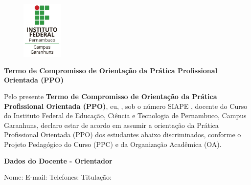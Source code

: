 \documentclass[12pt, a4paper]{article}
\begin{document}
\begin{figure}
  \centering
  \includegraphics[width=2cm]{logo-ifpe-garanhuns}
\end{figure}

\vspace{1cm}

\begin{center}
  \LARGE
  \textbf{
    Termo de Compromisso de Orientação da Prática Profissional Orientada (PPO)
  }
\end{center}

\vspace{0.5cm}

\begin{justify}
Pelo presente \textbf{Termo de Compromisso de Orientação da Prática Profissional
Orientada (PPO)}, eu, \underline{\hspace{10cm}}, sob o número SIAPE
\underline{\hspace{3.7cm}}, docente do Curso \underline{\hspace{6cm}} \\
\underline{\hspace{4cm}} do Instituto Federal de Educação, Ciência e Tecnologia
de Pernambuco, Campus Garanhuns, declaro estar de acordo em assumir a orientação
da Prática Profissional Orientada (PPO) dos estudantes abaixo discriminados,
conforme o Projeto Pedagógico do Curso (PPC) e da Organização Acadêmica (OA).
\end{justify}

\vspace{1cm}

\begin{center}
  \Large
  \textbf{Dados do Docente - Orientador}
\end{center}
Nome: \underline{\hspace{14.5cm}}
E-mail: \underline{\hspace{14.5cm}}
Telefones: \underline{\hspace{14cm}}
Titulação: \underline{\hspace{14cm}}
\end{document}

